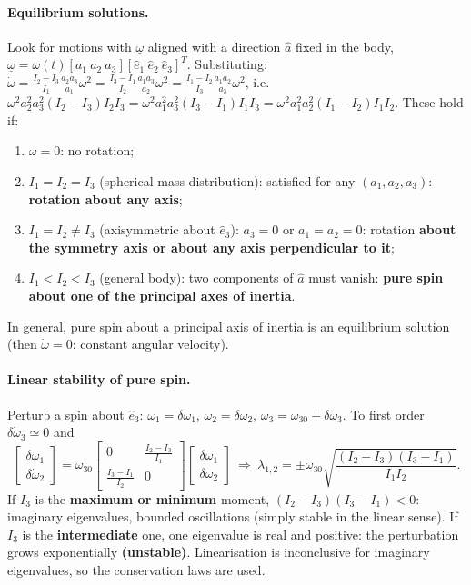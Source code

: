 \paragraph{Equilibrium solutions.} Look for motions with $\underline\omega$ aligned with a direction $\hat a$ fixed in the body,
$\underline\omega=\omega(t)[a_1\ a_2\ a_3][\hat e_1\ \hat e_2\ \hat e_3]^T$. Substituting:
$\dot\omega=\frac{I_2-I_3}{I_1}\frac{a_2a_3}{a_1}\omega^2=\frac{I_3-I_1}{I_2}\frac{a_1a_3}{a_2}\omega^2=\frac{I_1-I_2}{I_3}\frac{a_1a_2}{a_3}\omega^2$, i.e.
$\omega^{2}a_{2}^{2}a_{3}^{2}(I_{2}-I_{3})I_{2}I_{3}=\omega^{2}a_{1}^{2}a_{3}^{2}(I_{3}-I_{1})I_{1}I_{3}=\omega^{2}a_{1}^{2}a_{2}^{2}(I_{1}-I_{2})I_{1}I_{2}$. These hold if:
\begin{enumerate}[label=(\alph*)]
\item $\omega=0$: no rotation;
\item $I_1=I_2=I_3$ (spherical mass distribution): satisfied for any $(a_1,a_2,a_3)$: \textbf{rotation about any axis};
\item $I_1=I_2\neq I_3$ (axisymmetric about $\hat e_3$): $a_3=0$ or $a_1=a_2=0$: rotation \textbf{about the symmetry axis or about any axis perpendicular to it};
\item $I_1<I_2<I_3$ (general body): two components of $\hat a$ must vanish: \textbf{pure spin about one of the principal axes of inertia}.
\end{enumerate}
In general, pure spin about a principal axis of inertia is an equilibrium solution (then $\dot\omega=0$: constant angular velocity).

\paragraph{Linear stability of pure spin.} Perturb a spin about $\hat e_3$: $\omega_1=\delta\omega_1$, $\omega_2=\delta\omega_2$,
$\omega_3=\omega_{30}+\delta\omega_3$. To first order $\delta\dot\omega_3\simeq0$ and
\begin{equation}
\begin{bmatrix}\delta\dot\omega_1\\ \delta\dot\omega_2\end{bmatrix}=\omega_{30}\begin{bmatrix}0&\frac{I_2-I_3}{I_1}\\ \frac{I_3-I_1}{I_2}&0\end{bmatrix}\begin{bmatrix}\delta\omega_1\\ \delta\omega_2\end{bmatrix}
\ \Rightarrow\ \lambda_{1,2}=\pm\omega_{30}\sqrt{\frac{(I_2-I_3)(I_3-I_1)}{I_1I_2}} .
\end{equation}
If $I_3$ is the \textbf{maximum or minimum} moment, $(I_2-I_3)(I_3-I_1)<0$: imaginary eigenvalues, bounded oscillations (simply stable in
the linear sense). If $I_3$ is the \textbf{intermediate} one, one eigenvalue is real and positive: the perturbation grows exponentially
\textbf{(unstable)}. Linearisation is inconclusive for imaginary eigenvalues, so the conservation laws are used.

